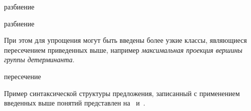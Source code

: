 \begin{SCn}
\begin{scnrelfromset}{разбиение}
\begin{scnindent}
        \end{scnindent}
    \end{scnrelfromset}
    \begin{scnrelfromset}{разбиение}
            \begin{scnindent}
            \end{scnindent}
            \begin{scnindent}
            \end{scnindent}
    \end{scnrelfromset}

\end{SCn}

При этом для упрощения могут быть введены более узкие классы, являющиеся пересечением приведенных выше, например \textit{максимальная проекция вершины группы детерминанта}.

\begin{SCn}

    \begin{scnreltoset}{пересечение}
    \end{scnreltoset}

\end{SCn}

Пример синтаксической структуры предложения, записанный с применением введенных выше понятий представлен на~\textit{} и~\textit{}.

